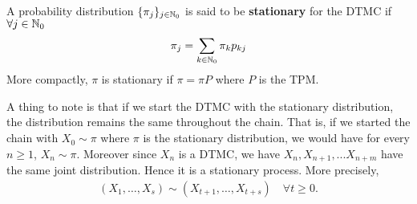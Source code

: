 \documentclass[a4paper,10pt,english]{article}
\begin{document}
\begin{defn}
  A probability distribution $\{\pi_j\}_{j \in \mathbb{N}_0}$ is said to
  be \textbf{stationary} for the DTMC if $\forall j \in \mathbb{N}_0$
\begin{align*}\pi_j = \sum_{k \in \mathbb{N}_0} \pi_k p_{kj}\end{align*}
More compactly, $\pi$ is stationary if $\pi = \pi P$ where $P$ is the TPM.
\end{defn}

A thing to note is that if we start the DTMC with the stationary distribution, the distribution remains the same throughout the chain. That is, if we started the chain with $X_0 \sim \pi$ where $\pi$ is the stationary distribution, we would have for every $n \geq 1$, $X_n \sim \pi$. Moreover since $X_n$ is a DTMC, we have $X_n, X_{n+1}, ... X_{n+m}$ have the same joint distribution. Hence it is a stationary process. More precisely,
\begin{align*}(X_1,\ldots,X_s)\sim(X_{t+1},\ldots,X_{t+s}) \quad \forall t \geq 0.\end{align*}
\end{document}
